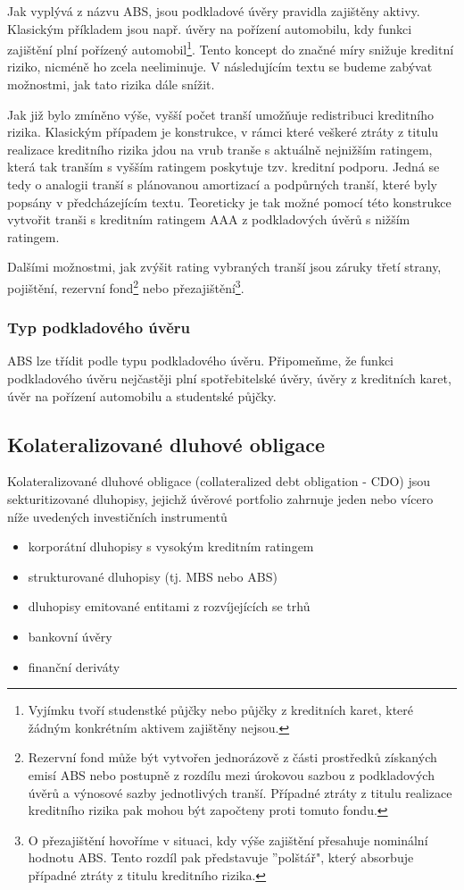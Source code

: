 \documentclass[a4paper]{book}
\begin{document}
Jak vyplývá z názvu ABS, jsou podkladové úvěry pravidla zajištěny aktivy. Klasickým příkladem jsou např. úvěry na pořízení automobilu, kdy funkci zajištění plní pořízený automobil\footnote{Vyjímku tvoří studenstké půjčky nebo půjčky z kreditních karet, které žádným konkrétním aktivem zajištěny nejsou.}. Tento koncept do značné míry snižuje kreditní riziko, nicméně ho zcela neeliminuje. V následujícím textu se budeme zabývat možnostmi, jak tato rizika dále snížit.

Jak již bylo zmíněno výše, vyšší počet tranší umožňuje redistribuci kreditního rizika. Klasickým případem je konstrukce, v rámci které veškeré ztráty z titulu realizace kreditního rizika jdou na vrub tranše s aktuálně nejnižším ratingem, která tak tranším s vyšším ratingem poskytuje tzv. kreditní podporu. Jedná se tedy o analogii tranší s plánovanou amortizací a podpůrných tranší, které byly popsány v předcházejícím textu. Teoreticky je tak možné pomocí této konstrukce vytvořit tranši s kreditním ratingem AAA z podkladových úvěrů s nižším ratingem.

Dalšími možnostmi, jak zvýšit rating vybraných tranší jsou záruky třetí strany, pojištění, rezervní fond\footnote{Rezervní fond může být vytvořen jednorázově z části prostředků získaných emisí ABS nebo postupně z rozdílu mezi úrokovou sazbou z podkladových úvěrů a výnosové sazby jednotlivých tranší. Případné ztráty z titulu realizace kreditního rizika pak mohou být započteny proti tomuto fondu.} nebo přezajištění\footnote{O přezajištění hovoříme v situaci, kdy výše zajištění přesahuje nominální hodnotu ABS. Tento rozdíl pak představuje ''polštář", který absorbuje případné ztráty z titulu kreditního rizika.}.

\subsubsection{Typ podkladového úvěru}

ABS lze třídit podle typu podkladového úvěru. Připomeňme, že funkci podkladového úvěru nejčastěji plní spotřebitelské úvěry, úvěry z kreditních karet, úvěr na pořízení automobilu a studentské půjčky.

\subsection{Kolateralizované dluhové obligace}

Kolateralizované dluhové obligace (collateralized debt obligation - CDO) jsou sekturitizované dluhopisy, jejichž úvěrové portfolio zahrnuje jeden nebo vícero níže uvedených investičních instrumentů
\begin{itemize}
\item korporátní dluhopisy s vysokým kreditním ratingem
\item strukturované dluhopisy (tj. MBS nebo ABS)
\item dluhopisy emitované entitami z rozvíjejících se trhů
\item bankovní úvěry
\item finanční deriváty
\end{itemize}
\end{document}
